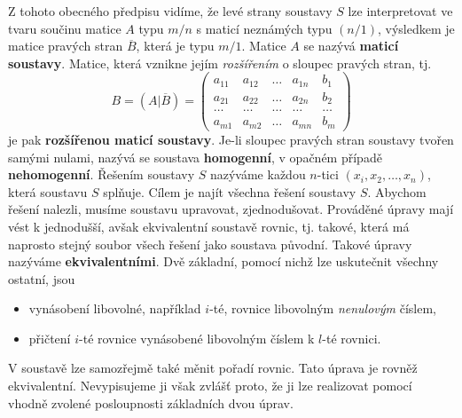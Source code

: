 {      Z tohoto obecného předpisu vidíme, že levé strany soustavy \(S\) lze interpretovat ve tvaru 
      součinu matice \(A\) typu \(m/n\) s maticí neznámých typu \((n/1)\), výsledkem je matice 
      pravých stran \(\overline{B}\), která je typu \(m/1\). Matice \(A\) se nazývá \textbf{maticí 
      soustavy}. Matice, která vznikne jejím \emph{rozšířením} o sloupec pravých stran, tj.
      \begin{equation}\label{mai:eq006}
        B = (A|\overline{B}) =
        \left(
          \begin{array}{cccc|c}
            a_{11} & a_{12} & \ldots & a_{1n} & b_1    \\
            a_{21} & a_{22} & \ldots & a_{2n} & b_2    \\
            \ldots & \ldots & \ldots & \ldots & \ldots \\
            a_{m1} & a_{m2} & \ldots & a_{mn} & b_m
          \end{array}
        \right)
      \end{equation}
      je pak \textbf{rozšířenou maticí soustavy}. Je-li sloupec pravých stran soustavy tvořen 
      samými nulami, nazývá se soustava \textbf{homogenní}, v opačném případě \textbf{nehomogenní}. 
      Řešením soustavy \(S\) nazýváme každou \(n\)-tici \((x_i, x_2,\ldots, x_n)\), která soustavu 
      \(S\) splňuje. Cílem je najít všechna řešení soustavy \(S\). Abychom řešení nalezli, musíme 
      soustavu upravovat, zjednodušovat. Prováděné úpravy mají vést k jednodušší, avšak 
      ekvivalentní soustavě rovnic, tj. takové, která má naprosto stejný soubor všech řešení jako 
      soustava původní. Takové úpravy nazýváme \textbf{ekvivalentními}. Dvě základní, pomocí nichž 
      lze uskutečnit všechny ostatní, jsou
      \begin{itemize}\addtolength{\itemsep}{-0.5\baselineskip}
        \item vynásobení libovolné, například \(i\)-té, rovnice libovolným \emph{nenulovým} číslem,
        \item přičtení \(i\)-té rovnice vynásobené libovolným číslem k \(l\)-té rovnici.
      \end{itemize}      
      V soustavě lze samozřejmě také měnit pořadí rovnic. Tato úprava je rovněž ekvivalentní. 
      Nevypisujeme ji však zvlášť proto, že ji lze realizovat pomocí vhodně zvolené posloupnosti 
      základních dvou úprav.
      
}
